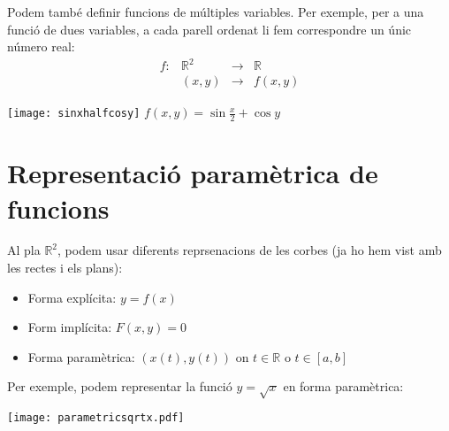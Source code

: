 \documentclass{beamer}
\begin{document}
\begin{frame}[allowframebreaks]
  \framebreak

  \begin{multicols}{2}
  Podem també definir funcions de múltiples variables. Per exemple, per a una funció de dues variables, a cada parell ordenat li fem correspondre un únic número real:
  \[
    \begin{array}{cccc}
      f:&\mathbb{R}^2&\rightarrow&\mathbb{R}\\
      &(x,y)&\rightarrow&f(x,y)
    \end{array}
  \]
  \columnbreak
  \null \vfill
  \begin{center}
    \texttt{[image: sinxhalfcosy]}
    \newline $f(x,y)=\sin{\frac{x}{2}+\cos{y}}$
  \end{center}
  \vfill \null
\end{multicols}

\end{frame}

\section{Representació paramètrica de funcions}

\begin{frame}
  Al pla $\mathbb{R}^2$, podem usar diferents reprsenacions de les corbes (ja ho hem vist amb les rectes i els plans):
  \begin{itemize}
    \item Forma explícita: $y=f(x)$
    \item Form implícita: $F(x,y)=0$
    \item Forma paramètrica: $\left(x(t),y(t)\right)$ on $t\in \mathbb{R}$ o $t\in [a,b]$
  \end{itemize}
  Per exemple, podem representar la funció $y=\sqrt{x}$ en forma paramètrica:
  \begin{center}
    \texttt{[image: parametricsqrtx.pdf]}
  \end{center}
\end{frame}




\end{document}
